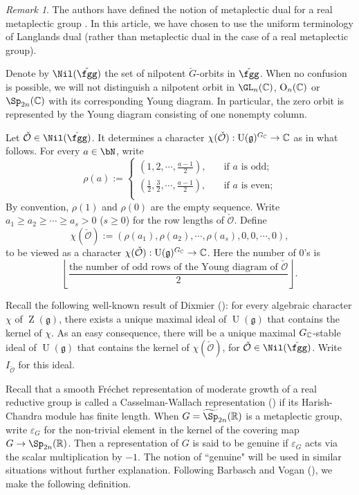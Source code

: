 \documentclass[12pt,a4paper]{amsart}
\newcommand{\CO}{{\mathcal {O}}}
\newcommand{\oO}{\operatorname{O}}
\newcommand{\oZ}{\operatorname{Z}}
\newcommand{\oU}{\operatorname{U}}
\newcommand{\g}{\mathfrak g}
\newcommand{\R}{\mathbb R}
\newcommand{\be}{\begin {equation}}
\newcommand{\ee}{\end {equation}}
\numberwithin{equation}{section}
\theoremstyle{remark}
\newtheorem*{remark}{Remark}
\begin{document}
\begin{remark} The authors have defined the notion of metaplectic dual for a real metaplectic group \cite{BMSZ1}. In this article, we have chosen to use the uniform terminology of Langlands dual (rather than metaplectic dual in the case of a real metaplectic group).
\end{remark}

Denote by $\Nil(\check \fgg)$ the set of nilpotent  $\check G$-orbits in $\check \fgg$.
When no confusion is possible, we will not distinguish a nilpotent orbit in $\GL_n(\C)$, $\oO_n(\C)$ or $\Sp_{2n}(\C)$ with its corresponding Young diagram. In particular, the zero orbit is represented by the Young diagram consisting of one nonempty column.

Let  $\check \CO \in \Nil(\check \fgg) $.  It determines a character $\chi(\check \CO): \oU(\g)^{G_\C}\rightarrow \C$ as in what follows. For every  $a\in \bN$, write
\[
  \rho(a):=\left\{ \begin{array}{ll}
                  (1, 2, \cdots, \frac{a-1}{2}), \quad &\textrm{if $a$ is odd;}\\
                    (\frac{1}{2}, \frac{3}{2}, \cdots, \frac{a-1}{2}), \quad &\textrm{if $a$ is even;}\\
                    \end{array}
                 \right.
\]
By convention, $\rho(1)$ and $\rho(0)$ are  the empty sequence.
Write $a_1\geq  a_2\geq \cdots\geq a_s>0$ ($s\geq 0$)  for the row lengths of  $\check \CO$. Define
\be\label{chico}
 \chi(\check \CO):= (\rho( a_1), \rho(a_2),  \cdots, \rho(a_s), 0, 0, \cdots, 0 ),
\ee
to be viewed as a character $\chi(\check \CO): \oU(\g)^{G_\C}\rightarrow \C$.
Here the number of $0$'s is
\[
 \left\lfloor\frac{\textrm{the number of odd rows of the Young diagram of $\check \CO$}}{2}\right\rfloor.
\]


Recall the following well-known result of Dixmier (\cite[Section 3]{Bor}): for every algebraic character $\chi$ of $\oZ(\g)$, there exists a unique maximal ideal of $\oU(\g)$ that contains the kernel of $\chi$. %
As an easy consequence, there will be a unique maximal $G_{\mathbb{C}}$-stable ideal of $\oU(\g)$ that contains the kernel of $\chi(\check \CO)$, for $\check \CO \in \Nil(\check \fgg)$. Write $I_{\check \CO}$ for this ideal.

Recall that a  smooth Fr\'echet representation of  moderate growth  of a real reductive group is called a Casselman-Wallach representation (\cite{Ca89,Wa2}) if its Harish-Chandra module has  finite length. When $G=\widetilde \Sp_{2n}(\R)$ is a metaplectic group, write $\varepsilon_G$ for the non-trivial element in the kernel of the covering map $G\rightarrow \Sp_{2n}(\R)$. Then a representation of $G$ is said to be genuine if $\varepsilon_G$ acts via the scalar multiplication by $-1$. The notion of ``genuine" will be used in similar situations without further explanation.
Following Barbasch and Vogan (\cite{ABV,BVUni}), we make the following definition.
\end{document}
